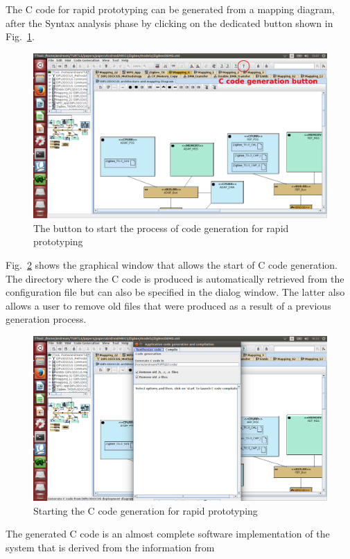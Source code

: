 \documentclass{llncs}
\newcommand{\screenshotsize}{1.0\textwidth}
\begin{document}
%
The C code for rapid prototyping can be generated from a mapping diagram, after the Syntax analysis phase by clicking on
the dedicated button shown in Fig.~\ref{fig:CCodeGenButton}.
%
\begin{figure}[htbp]
	\centering
 	\includegraphics[width=\screenshotsize]{figures/screenshot/CCodeGenButton.pdf}
	\caption{The button to start the process of code generation for rapid prototyping}
	\label{fig:CCodeGenButton}
\end{figure}
%
Fig.~\ref{fig:CCodeGen1} shows the graphical window that allows the start of C code generation. The directory where the
C code is produced is automatically retrieved from the configuration file but can also be specified in the dialog
window. The latter also allows a user to remove old files that were produced as a result of a previous generation
process.
%
\begin{figure}[htbp]
	\centering
 	\includegraphics[width=\screenshotsize]{figures/screenshot/CCodeGen1.png}
	\caption{Starting the C code generation for rapid prototyping}
	\label{fig:CCodeGen1}
\end{figure}
%
The generated C code is an almost complete software implementation of the system that is derived from the information from
\end{document}
